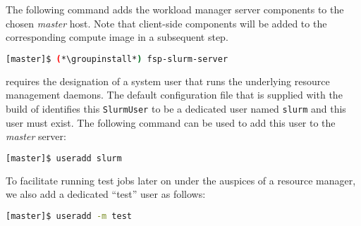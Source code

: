 The following command adds the \SLURM{} workload manager server components to the
chosen {\em master} host. Note that client-side components will be added to
the corresponding compute image in a subsequent step.

\begin{lstlisting}[language=bash,keywords={}]
[master]$ (*\groupinstall*) fsp-slurm-server
\end{lstlisting}

\SLURM{} requires the designation of a system user that runs the underlying
resource management daemons. The default configuration file that is supplied
with the \OHPC{} build of \SLURM{} identifies this \texttt{SlurmUser} to be a
dedicated user named \texttt{slurm} and this user must exist. 
The following command can be used to add this user to the {\em
  master} server:

\begin{lstlisting}[language=bash,keywords={}]
[master]$ useradd slurm
\end{lstlisting}

To facilitate running test jobs later on under the auspices of a resource
manager, we also add a dedicated ``test'' user as follows:

\begin{lstlisting}[language=bash,keywords={}]
[master]$ useradd -m test
\end{lstlisting}


